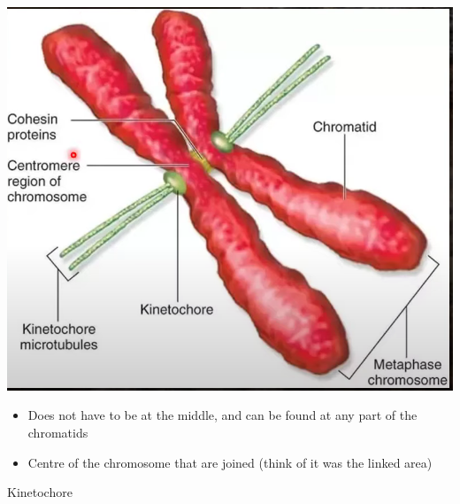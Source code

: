 \documentclass{article}
\begin{document}
\includegraphics[scale=0.6]{centromere.png}
\begin{itemize}
    \item Does not have to be at the middle, and can be found at any part of the chromatids
    \item Centre of the chromosome that are joined (think of it was the linked area)
\end{itemize}
Kinetochore
\end{document}
